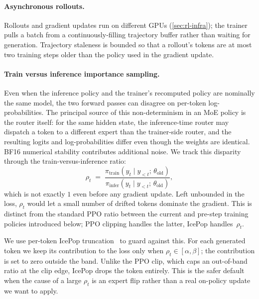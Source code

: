 \documentclass{llmxive}
\begin{document}
\paragraph{Asynchronous rollouts.}
Rollouts and gradient updates run on different GPUs
(\cref{sec:rl-infra}); the trainer pulls a batch from a
continuously-filling trajectory buffer rather than waiting for
generation. Trajectory staleness is bounded so that a rollout's tokens
are at most two training steps older than the policy used in the
gradient update.

\paragraph{Train versus inference importance sampling.}
Even when the inference policy and the trainer's recomputed policy are
nominally the same model, the two forward passes can disagree on
per-token log-probabilities. The principal source of this non-determinism in
an MoE policy is the router itself: for the same hidden state, the inference-time
router may dispatch a token to a different expert than the trainer-side
router, and the resulting logits and log-probabilities
differ even though the weights are identical. BF16 numerical stability contributes
additional noise. We track this disparity through the train-versus-inference
ratio:
\begin{equation*}
  \rho_t \;=\; \frac{\pi_\text{train}(y_t \mid y_{<t};\, \theta_\text{old})}
                    {\pi_\text{infer}(y_t \mid y_{<t};\, \theta_\text{old})},
\end{equation*}
which is not exactly $1$ even before any gradient update. Left
unbounded in the loss, $\rho_t$ would let a small number of drifted
tokens dominate the gradient. This is distinct from the standard PPO
ratio between the current and pre-step training policies introduced
below; PPO clipping handles the latter, IcePop handles~$\rho_t$.

We use per-token IcePop truncation~\cite{ring1t} to guard against this.
For each generated token we keep its contribution to the loss only when
$\rho_t \in [\alpha, \beta]$; the contribution is set to zero outside
the band. Unlike the PPO clip, which caps an out-of-band ratio at the
clip edge, IcePop drops the token entirely. This is the safer default
when the cause of a large $\rho_t$ is an expert flip rather than a real
on-policy update we want to apply.
\end{document}
